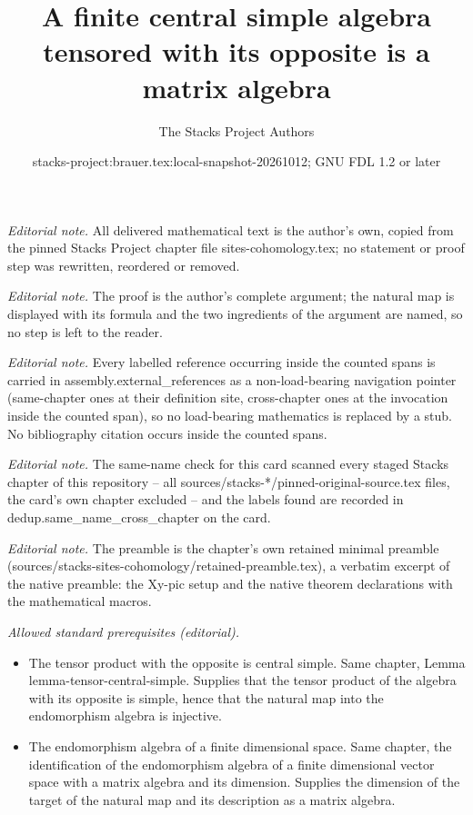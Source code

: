 \documentclass[10pt,a4paper]{amsart}
\title{A finite central simple algebra tensored with its opposite is a matrix algebra}
\author{The Stacks Project Authors}
\date{stacks-project:brauer.tex:local-snapshot-20261012; GNU FDL 1.2 or later}
\theoremstyle{plain}
\theoremstyle{definition}
\theoremstyle{remark}
\numberwithin{equation}{subsection}
\begin{document}
\maketitle
\noindent\textit{Editorial note.} All delivered mathematical text is the author's own, copied from the pinned Stacks Project chapter file sites-cohomology.tex; no statement or proof step was rewritten, reordered or removed.\par\medskip
\noindent\textit{Editorial note.} The proof is the author's complete argument; the natural map is displayed with its formula and the two ingredients of the argument are named, so no step is left to the reader.\par\medskip
\noindent\textit{Editorial note.} Every labelled reference occurring inside the counted spans is carried in assembly.external\_references as a non-load-bearing navigation pointer (same-chapter ones at their definition site, cross-chapter ones at the invocation inside the counted span), so no load-bearing mathematics is replaced by a stub. No bibliography citation occurs inside the counted spans.\par\medskip
\noindent\textit{Editorial note.} The same-name check for this card scanned every staged Stacks chapter of this repository -- all sources/stacks-*/pinned-original-source.tex files, the card's own chapter excluded -- and the labels found are recorded in dedup.same\_name\_cross\_chapter on the card.\par\medskip
\noindent\textit{Editorial note.} The preamble is the chapter's own retained minimal preamble (sources/stacks-sites-cohomology/retained-preamble.tex), a verbatim excerpt of the native preamble: the Xy-pic setup and the native theorem declarations with the mathematical macros.\par\medskip
\noindent\textit{Allowed standard prerequisites (editorial).}\begin{itemize}
\item The tensor product with the opposite is central simple. Same chapter, Lemma lemma-tensor-central-simple. Supplies that the tensor product of the algebra with its opposite is simple, hence that the natural map into the endomorphism algebra is injective.
\item The endomorphism algebra of a finite dimensional space. Same chapter, the identification of the endomorphism algebra of a finite dimensional vector space with a matrix algebra and its dimension. Supplies the dimension of the target of the natural map and its description as a matrix algebra.
\end{itemize}\medskip
\end{document}
